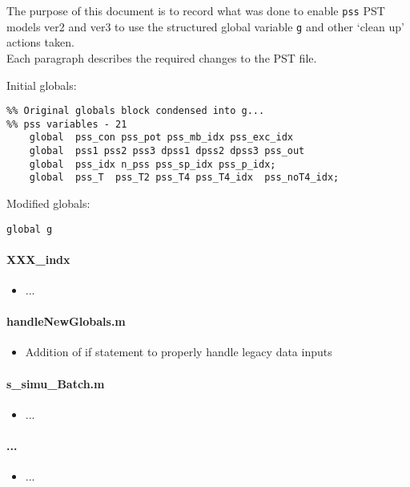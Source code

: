 \documentclass[12pt]{article}
\begin{document}
The purpose of this document is to record what was done to enable \verb|pss| PST models ver2 and ver3 to use the structured global variable \verb|g| and other `clean up' actions taken. \\
Each paragraph describes the required changes to the PST file.

Initial globals:
\begin{verbatim}
%% Original globals block condensed into g...
%% pss variables - 21
    global  pss_con pss_pot pss_mb_idx pss_exc_idx
    global  pss1 pss2 pss3 dpss1 dpss2 dpss3 pss_out
    global  pss_idx n_pss pss_sp_idx pss_p_idx;
    global  pss_T  pss_T2 pss_T4 pss_T4_idx  pss_noT4_idx;
\end{verbatim}

Modified globals:
\begin{verbatim}
global g
\end{verbatim}

\paragraph{XXX\_indx}
	\begin{itemize}
		\item ...
	\end{itemize}

\paragraph{handleNewGlobals.m}
	\begin{itemize}
		\item Addition of if statement to properly handle legacy data inputs
	\end{itemize}


\paragraph{s\_simu\_Batch.m}
	\begin{itemize}
		\item ...
	\end{itemize}

\paragraph{...}
	\begin{itemize}
		\item ...
	\end{itemize}

\end{document}
